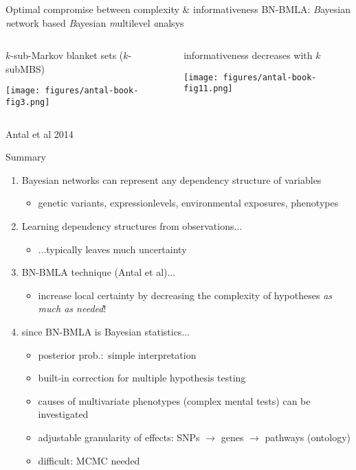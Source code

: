 \documentclass[aspectratio=169]{beamer}
\begin{document}
\begin{frame}{Optimal compromise between complexity \& informativeness}
  {BN-BMLA: \emph{B}ayesian \emph{n}etwork based \emph{B}ayesian \emph{m}ultilevel
  \emph{a}nalsys}

\begin{columns}[t]
\begin{column}{0.5\textwidth}
  $k$-sub-Markov blanket sets ($k$-subMBS)

\texttt{[image: figures/antal-book-fig3.png]}
\end{column}

\begin{column}{0.5\textwidth}
  informativeness decreases with $k$

\texttt{[image: figures/antal-book-fig11.png]}
\end{column}
\end{columns}
\begin{center}
  \tiny{Antal et al 2014}
\end{center}
\end{frame}

\begin{frame}{Summary}
\begin{enumerate}
  \item Bayesian networks can represent any dependency structure of variables
  \begin{itemize}
    \item genetic variants, expressionlevels, environmental exposures, phenotypes
  \end{itemize}
  \item Learning dependency structures from observations...
  \begin{itemize}
    \item ...typically leaves much uncertainty
  \end{itemize}
  \item BN-BMLA technique (Antal et al)...
  \begin{itemize}
    \item increase local certainty by decreasing the complexity of hypotheses \emph{as much as needed}!
  \end{itemize}
  \item<2-> since BN-BMLA is Bayesian statistics...
  \begin{itemize}
    \item posterior prob.:~simple interpretation
    \item built-in correction for multiple
      hypothesis testing
    \item causes of multivariate phenotypes (complex mental tests) can be investigated
    \item adjustable granularity of effects: SNPs $\to$ genes $\to$ pathways (ontology)
    \item difficult: MCMC needed
  \end{itemize}
\end{enumerate}
\end{frame}
\end{document}
